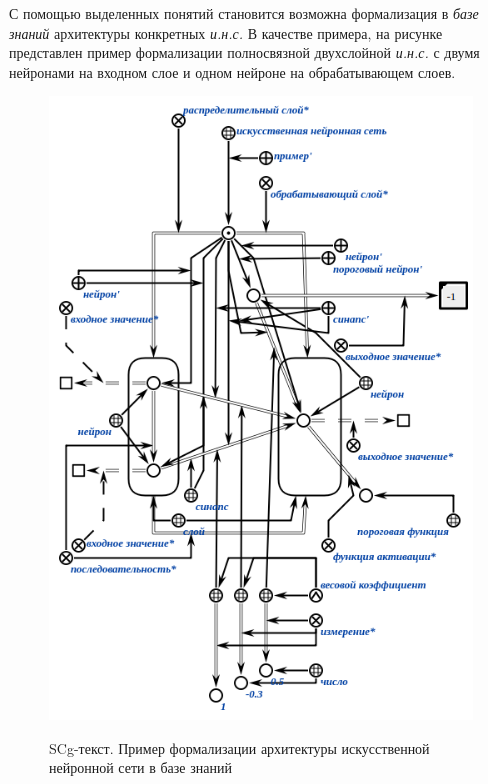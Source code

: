 \begin{SCn}
\end{SCn}

\begin{SCn}
\end{SCn}

С помощью выделенных понятий становится возможна формализация в \textit{базе знаний} архитектуры конкретных \textit{и.н.с.} В качестве примера, на рисунке \textit{} представлен пример формализации полносвязной двухслойной \textit{и.н.с.} с двумя нейронами на входном слое и одном нейроне на обрабатывающем слоев.

\begin{figure}
	\caption{SCg-текст. Пример формализации архитектуры искусственной нейронной сети в базе знаний}
	\includegraphics[width=0.8\linewidth]{author/part3/figures/neural_network_scg.png}
	\label{fig:neural_network_scg}
\end{figure}

